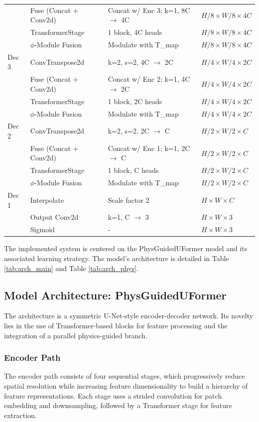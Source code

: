 \documentclass[10pt,twocolumn,letterpaper]{article}
\begin{document}
\begin{table}[t]
{\begin{tabular}{@{}llll@{}}
& Fuse (Concat + Conv2d) & Concat w/ Enc 3; k=1, 8C $\rightarrow$ 4C & $H/8 \times W/8 \times 4C$ \\
& TransformerStage & 1 block, 4C heads & $H/8 \times W/8 \times 4C$ \\
& $\phi$-Module Fusion & Modulate with T\_map & $H/8 \times W/8 \times 4C$ \\
\midrule
Dec 3 & ConvTranspose2d & k=2, s=2, 4C $\rightarrow$ 2C & $H/4 \times W/4 \times 2C$ \\
& Fuse (Concat + Conv2d) & Concat w/ Enc 2; k=1, 4C $\rightarrow$ 2C & $H/4 \times W/4 \times 2C$ \\
& TransformerStage & 1 block, 2C heads & $H/4 \times W/4 \times 2C$ \\
& $\phi$-Module Fusion & Modulate with T\_map & $H/4 \times W/4 \times 2C$ \\
\midrule
Dec 2 & ConvTranspose2d & k=2, s=2, 2C $\rightarrow$ C & $H/2 \times W/2 \times C$ \\
& Fuse (Concat + Conv2d) & Concat w/ Enc 1; k=1, 2C $\rightarrow$ C & $H/2 \times W/2 \times C$ \\
& TransformerStage & 1 block, C heads & $H/2 \times W/2 \times C$ \\
& $\phi$-Module Fusion & Modulate with T\_map & $H/2 \times W/2 \times C$ \\
\midrule
Dec 1 & Interpolate & Scale factor 2 & $H \times W \times C$ \\
& Output Conv2d & k=1, C $\rightarrow$ 3 & $H \times W \times 3$ \\
& Sigmoid & - & $H \times W \times 3$ \\
\bottomrule
\end{tabular}%
}
\end{table}

The implemented system is centered on the PhysGuidedUFormer model and its associated learning strategy. The model's architecture is detailed in Table \ref{tab:arch_main} and Table \ref{tab:arch_phys}.

\subsection{Model Architecture: PhysGuidedUFormer}
The architecture is a symmetric U-Net-style encoder-decoder network. Its novelty lies in the use of Transformer-based blocks for feature processing and the integration of a parallel physics-guided branch.

\subsubsection{Encoder Path}
The encoder path consists of four sequential stages, which progressively reduce spatial resolution while increasing feature dimensionality to build a hierarchy of feature representations. Each stage uses a strided convolution for patch embedding and downsampling, followed by a Transformer stage for feature extraction.
\end{document}
